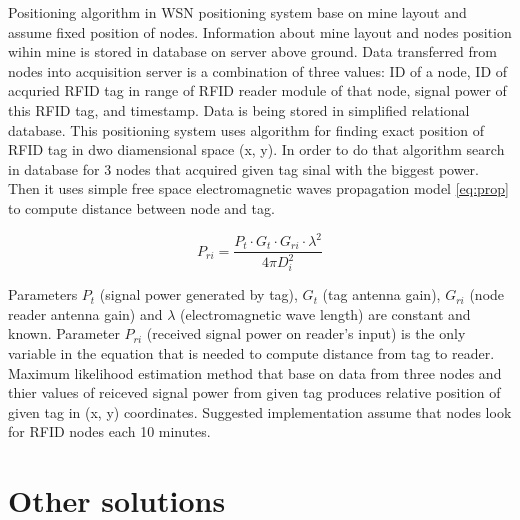 \documentclass[../main.tex]{subfiles}
\begin{document}
Positioning algorithm in WSN positioning system base on mine layout and assume fixed position of nodes. Information about mine layout and nodes position wihin mine is stored in database on server above ground. Data transferred from nodes into acquisition server is a combination of three values: ID of a node, ID of acquried RFID tag in range of RFID reader module of that node, signal power of this RFID tag, and timestamp. Data is being stored in simplified relational database. This positioning system uses algorithm for finding exact position of RFID tag in dwo diamensional space (x, y). In order to do that algorithm search in database for 3 nodes that acquired given tag sinal with the biggest power. Then it uses simple free space electromagnetic waves propagation model \eqref{eq:prop} to compute distance between node and tag.

\begin{equation}
\label{eq:prop}
P_{ri}=\frac{P_t \cdot G_t \cdot G_{ri} \cdot \lambda^2}{4\pi D_i^2}
\end{equation}

Parameters $P_t$ (signal power generated by tag), $G_t$ (tag antenna gain), $G_{ri}$ (node reader antenna gain) and $\lambda$ (electromagnetic wave length) are constant and known. Parameter ${P_{ri}}$ (received signal power on reader's input) is the only variable in the equation that is needed to compute distance from tag to reader. Maximum likelihood estimation method that base on data from three nodes and thier values of reiceved signal power from given tag produces relative position of given tag in (x, y) coordinates. Suggested implementation \cite{WSN_tracking} assume that nodes look for RFID nodes each 10 minutes.


\section{Other solutions} %
\label{sec:other_solutions}
\end{document}
